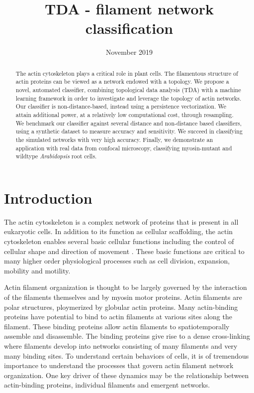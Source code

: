 \documentclass[10pt]{article}
\title{TDA - filament network classification}
\date{November 2019}
\begin{document}
\maketitle

\begin{abstract}

The actin cytoskeleton plays a critical role in plant cells. The filamentous structure of actin proteins can be viewed as a network endowed with a topology. We propose a novel, automated classifier, combining topological data analysis (TDA) with a machine learning framework in order to investigate and leverage the topology of actin networks. Our classifier is non-distance-based, instead using a persistence vectorization. We attain additional power, at a relatively low computational cost, through resampling. We benchmark our classifier against several distance and non-distance based classifiers, using a synthetic dataset to measure accuracy and sensitivity. We succeed in classifying the simulated networks with very high accuracy. Finally, we demonstrate an application with real data from confocal microscopy, classifying myosin-mutant and wildtype \textit{Arabidopsis} root cells.

    
\end{abstract}

\section{Introduction}
The actin cytoskeleton is a complex network of proteins that is present in all eukaryotic cells. In addition to its function as cellular scaffolding, the actin cytoskeleton enables several basic cellular functions including the control of cellular shape and direction of movement \cite{thomas2009actin}. These basic functions are critical to many higher order physiological processes such as cell division, expansion, mobility and motility\cite{freedman2017versatile}. 

Actin filament organization is thought to be largely governed by the interaction of the filaments themselves and by myosin motor proteins. Actin filaments are polar structures, ploymerized by globular actin proteins. Many actin-binding proteins have potential to bind to actin filaments at various sites along the filament. These binding proteins allow actin filaments to spatiotemporally assemble and disassemble. The binding proteins give rise to a dense cross-linking where filaments develop into networks consisting of many filaments and very many binding sites. To understand certain behaviors of cells, it is of tremendous importance to understand the processes that govern actin filament network organization. One key driver of these dynamics may be the relationship between actin-binding proteins, individual filaments and emergent networks.
\end{document}
